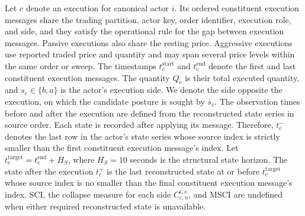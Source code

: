 \documentclass[11pt]{article}
\newenvironment{review}{\begingroup\color{blue}}{\endgroup}
\begin{document}
Let $c$ denote an execution for canonical actor $i$. Its ordered constituent execution messages share the trading partition,
actor key, order identifier, execution role, and side, and they satisfy \begin{review}the operational rule for the gap between execution messages\end{review}. Passive executions
also share the resting price. Aggressive executions use reported traded price and quantity and may span
several price levels within the same order or sweep. The timestamps $t_c^{\mathrm{start}}$ and $t_c^{\mathrm{end}}$ denote
the first and last constituent execution messages. The quantity $Q_c$ is their total executed quantity, and $s_c\in\{b,a\}$ is the actor's
execution side. We denote \begin{review}the side opposite the execution, on which the candidate posture is sought\end{review} by $\bar{s}_c$. \begin{review}The observation times before and after the execution\end{review} are
defined from the reconstructed state series in source order. Each state is recorded after applying its message. Therefore,
$t_c^{-}$ denotes \begin{review}the last row in the actor's state series\end{review} whose source index is strictly smaller than the first constituent execution message's index. Let
$t_c^{\mathrm{target}}=t_c^{\mathrm{end}}+H_S$, where $H_S=10$ seconds is the structural state horizon. \begin{review}The state after the execution\end{review} $t_c^{+}$ is the last reconstructed state at or before $t_c^{\mathrm{target}}$ whose source index is no smaller than
the final constituent execution message's index. SCI, \begin{review}the collapse measure for each side\end{review} $C^{i,s}_{c,n}$, and MSCI are undefined when either
required reconstructed state is unavailable.
\end{document}
